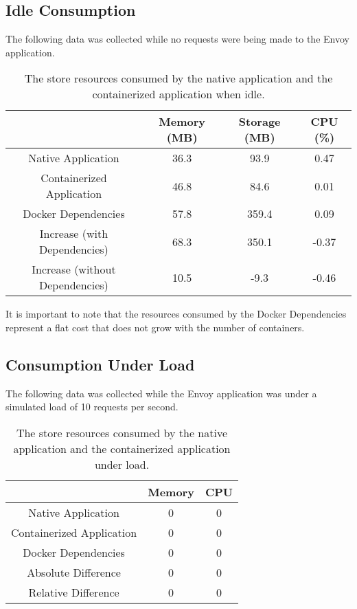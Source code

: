 \documentclass{article}
\begin{document}
\subsection{Idle Consumption}
The following data was collected while no requests were being made to the Envoy application.

\begin{table}[h!]
\begin{tabular}{ |c|c|c|c| }
 \hline
   & Memory (MB) & Storage (MB) & CPU (\%) \\ 
 \hline
 Native Application & 36.3 & 93.9 & 0.47 \\
 \hline
 Containerized Application & 46.8 & 84.6 & 0.01 \\
 \hline
 Docker Dependencies & 57.8 & 359.4 & 0.09 \\
 \hline\hline
 Increase (with Dependencies) & 68.3 & 350.1 & -0.37 \\
 \hline
 Increase (without Dependencies) & 10.5 & -9.3 & -0.46 \\
 \hline
\end{tabular}
\caption{The store resources consumed by the native application and the containerized application when idle.}
\label{table:1}
\end{table}

It is important to note that the resources consumed by the Docker Dependencies represent a flat cost that  does not grow with the number of containers.

\subsection{Consumption Under Load}
The following data was collected while the Envoy application was under a simulated load of 10 requests per second.

\begin{table}[h!]
\begin{tabular}{ |c|c|c| }
 \hline
   & Memory & CPU \\ 
 \hline
 Native Application & 0 & 0\\
 \hline
 Containerized Application & 0 & 0 \\
 \hline
 Docker Dependencies & 0 & 0 \\
 \hline\hline
 Absolute Difference & 0 & 0 \\
 \hline
 Relative Difference & 0 & 0 \\
 \hline
\end{tabular}
\caption{The store resources consumed by the native application and the containerized application under load.}
\label{table:2}
\end{table}
\end{document}
